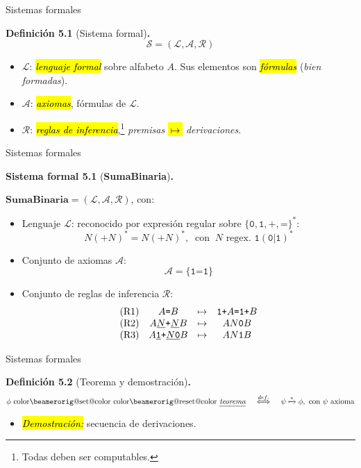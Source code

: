 \documentclass[10pt,xcolor=dvipsnames,aspectratio=169,spanish]{beamer}
\makeatletter
\let\HL\hl
\renewcommand\hl{%
  \let\set@color\beamerorig@set@color
  \let\reset@color\beamerorig@reset@color
  \HL}
\newcommand{\hle}[1]{\hl{\emph{#1}}}
\makeatother
\begin{document}
\begin{frame}{Sistemas formales}

\textbf{Definición 5.1} (Sistema formal)\textbf{.}
{\Large $$\mathcal{S} = (\mathcal{L}, \mathcal{A}, \mathcal{R})$$}
\vspace*{-5mm}
\begin{itemize}
    \item $\mathcal{L}$: \hle{lenguaje formal} sobre alfabeto $A$. Sus elementos son \hle{fórmulas} (\emph{bien formadas}).
    \item $\mathcal{A}$: \hle{axiomas}, fórmulas de $\mathcal{L}$.
    \item $\mathcal{R}$: \hle{reglas de inferencia},\footnote{Todas deben ser computables.} \emph{premisas} \hl{$\mapsto$} \emph{derivaciones}.
\end{itemize}

\end{frame}

\begin{frame}{Sistemas formales}

\textbf{Sistema formal 5.1} (\textbf{SumaBinaria})\textbf{.}

$\textbf{SumaBinaria}=(\mathcal{L}, \mathcal{A}, \mathcal{R})$, con:

\begin{itemize}
    \item Lenguaje $\mathcal{L}$: reconocido por expresión regular sobre $\{\texttt{0}, \texttt{1}, \texttt{+}, \texttt{=}\}^*$:
    $$
        N(\texttt{+}N)^*=N(\texttt{+}N)^*,\;\;\text{con}\;\;N\text{ regex. }\texttt{1}(\texttt{0}|\texttt{1})^*
    $$
    \item Conjunto de axiomas $\mathcal{A}$:
    $$
        \mathcal{A} = \{\texttt{1=1}\}
    $$
    \item Conjunto de reglas de inferencia $\mathcal{R}$:
    $$
    \begin{matrix}
    \text{(R1)} & A\texttt{=}B & \mapsto & \texttt{1+}A\texttt{=}\texttt{1+}B \\
    \text{(R2)} & A\underline{N}\texttt{+}\underline{N}B & \mapsto & AN\texttt{0}B \\
    \text{(R3)} & A\texttt{\underline{1}+}\underline{N\texttt{0}}B & \mapsto & AN\texttt{1}B
    \end{matrix}
    $$
\end{itemize}

\end{frame}

\begin{frame}{Sistemas formales}

\textbf{Definición 5.2} (Teorema y demostración)\textbf{.}
{\large $$\phi\text{ \hle{teorema}} \;\;\; \stackrel{def.}{\iff} \;\;\; \psi \xmapsto{*} \phi,\text{ con }\psi\text{ axioma}$$}
\vspace*{-5mm}
\begin{itemize}
    \item \hle{Demostración:} secuencia de derivaciones.
\end{itemize}
\end{frame}
\end{document}
